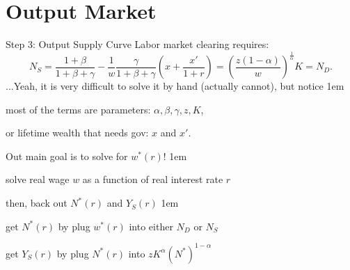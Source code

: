 \documentclass[11pt,aspectratio=43]{beamer}
\let\olditemize=\itemize
\let\endolditemize=\enditemize
\renewenvironment{itemize}{\olditemize \itemsep1em}{\endolditemize}
\theoremstyle{definition}
\begin{document}
\section{Output Market}
\label{sec:Output_Market}

\begin{frame}{Step 3: Output Supply Curve}
\label{slide:Step_3__Output_Supply_Curve}
    Labor market clearing requires:
    \begin{equation*}
        N_{S} = \frac{1+\beta}{1+\beta+\gamma} - \frac{1}{w} \frac{\gamma}{1+\beta+\gamma}
                \left(
                    x + \frac{x'}{1+r}
                \right)
                =
                \left(
                    \frac{z ( 1-\alpha )}{w}
                \right)^{\frac{1}{\alpha}} K
                = N_{D}
    .\end{equation*}
    ...Yeah, it is very difficult to solve it by hand (actually cannot), but notice
    \begin{itemize}
        \item most of the terms are parameters: $ \alpha, \beta, \gamma, z, K $,
        \item or lifetime wealth that needs gov: $ x $ and $ x' $.
        \item Out main goal is to \alert{solve for $ w^{*}( r ) $!}
        \begin{itemize}
            \item solve real wage $ w $ as a function of real interest rate $ r $
            \item then, back out $ N^{*}( r ) $ and $ Y_{S}( r ) $
            \begin{itemize}
                \item get $ N^{*}( r ) $ by plug $ w^{*}( r ) $ into either $ N_{D} $ or $ N_{S} $
                \item get $ Y_{S}( r ) $ by plug $ N^{*}( r ) $ into $ z K^{\alpha} ( N^{*} )^{1-\alpha} $
            \end{itemize}
        \end{itemize}
    \end{itemize}
\end{frame}
\end{document}
